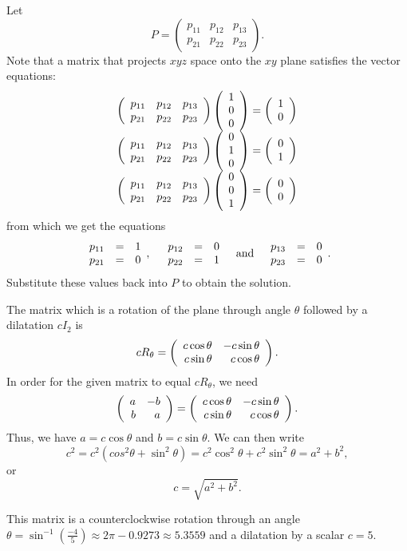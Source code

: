 \soln Let
\[ P = \left(\begin{array}{rrr} p_{11} & p_{12} & p_{13} \\
p_{21} & p_{22} & p_{23}\end{array}\right). \]
Note that a matrix that projects $xyz$ space onto the $xy$ plane
satisfies the vector equations:
\[ \begin{array}{c} \left(\begin{array}{rrr} p_{11} & p_{12} &
p_{13} \\ p_{21} & p_{22} & p_{23} \end{array}\right)
\left(\begin{array}{r} 1 \\ 0 \\ 0\end{array}\right) = \left(\begin{array}{r} 1 \\ 0\end{array}\right) \\
\left(\begin{array}{rrr} p_{11} & p_{12} & p_{13} \\ p_{21} &
p_{22} & p_{23} \end{array}\right) \left(\begin{array}{r} 0 \\ 1 \\ 0\end{array}\right) = \left(\begin{array}{r} 0 \\ 1\end{array}\right) \\
\left(\begin{array}{rrr} p_{11} & p_{12} & p_{13} \\ p_{21} & p_{22}
& p_{23} \end{array}\right) \left(\begin{array}{r} 0 \\ 0 \\ 1\end{array}\right) = \left(\begin{array}{r} 0 \\ 0\end{array}\right) \end{array} 
\]
from which we get the equations
\[ \begin{array}{rrrrrrr}
p_{11} & = & 1 \\
p_{21} & = & 0 \end{array},
\quad
\begin{array}{rrrrrrr}
p_{12} & = & 0 \\
p_{22} & = & 1 \end{array}
\quad\mbox{and}\quad
\begin{array}{rrrrrrr}
p_{13} & = & 0 \\
p_{23} & = & 0 \end{array}. 
\]
Substitute these values back into $P$ to obtain the solution.

 The matrix which is a rotation of the plane 
through angle $\theta$ followed by a dilatation $cI_2$ is
\[
cR_\theta =
\left(\begin{array}{rr} c\cos\theta & -c\sin\theta\\ c\sin\theta &c\cos\theta\end{array}\right).
\]
In order for the given matrix to equal $cR_\theta$, we need
\[
\left(\begin{array}{rr} a & -b\\ b &a\end{array}\right) =
\left(\begin{array}{rr} c\cos\theta & -c\sin\theta\\ c\sin\theta &c\cos\theta\end{array}\right).
\]
Thus, we have $a = c\cos\theta$ and $b = c\sin\theta$.  We can then write
\[
c^2 = c^2(cos^2\theta + \sin^2\theta) = c^2\cos^2\theta + c^2\sin^2\theta
= a^2 + b^2,
\]
or
\[
c = \sqrt{a^2 + b^2}.
\]

 \ans This matrix is a counterclockwise rotation through an 
angle $\theta = \sin^{-1}\left(\frac{-4}{5}\right) \approx 2\pi-0.9273
\approx 5.3559$ and a dilatation by a scalar $c = 5$.


